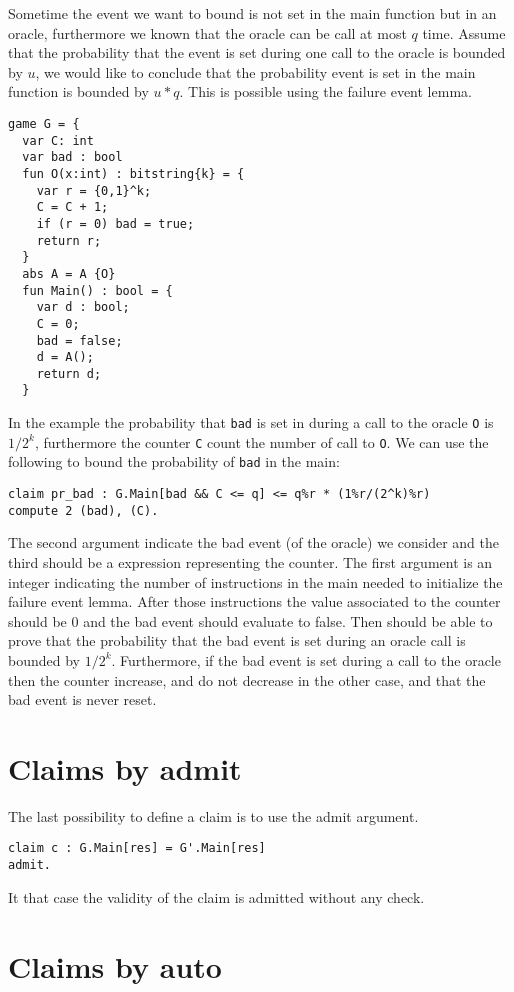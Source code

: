 Sometime the event we want to bound is not set in the main function
but in an oracle, furthermore we known that the oracle can be call at
most $q$ time. Assume that the probability that the event is set during
one call to the oracle is bounded by $u$, we would like to conclude 
that the probability event is set in the main function is bounded by
$u*q$. This is possible using the failure event lemma.
\begin{verbatim}
game G = {
  var C: int
  var bad : bool
  fun O(x:int) : bitstring{k} = {
    var r = {0,1}^k;
    C = C + 1;
    if (r = 0) bad = true;
    return r;
  }
  abs A = A {O}
  fun Main() : bool = {
    var d : bool;
    C = 0;
    bad = false;
    d = A();
    return d;
  }    
\end{verbatim}
In the example the probability that \verb+bad+ is set in during a
call to the oracle \verb+O+ is $1/2^k$, furthermore the counter \verb+C+
count the number of call to \verb+O+.
We can use the following to bound the probability of \verb+bad+ in the main:
\begin{verbatim} 
claim pr_bad : G.Main[bad && C <= q] <= q%r * (1%r/(2^k)%r)
compute 2 (bad), (C).
\end{verbatim}

The second argument indicate the bad event (of the oracle) 
we consider and the third should be a expression representing the counter. 
The first argument is an integer indicating the number of instructions
in the main needed to initialize the failure event lemma. 
After those instructions the value associated to the counter should be 0
and the bad event should evaluate to false.
Then \easycrypt should be able to prove that the probability that the bad
event is set during an oracle call is bounded by $1/2^k$. Furthermore,
if the bad event is set during a call to the oracle then the counter
increase, and do not decrease in the other case, and that the bad event
is never reset.

\section{Claims by admit}
The last possibility to define a claim is to use the admit argument.
\begin{verbatim}
claim c : G.Main[res] = G'.Main[res] 
admit.
\end{verbatim}
It that case the validity of the claim is admitted without any check.

\section{Claims by auto}


